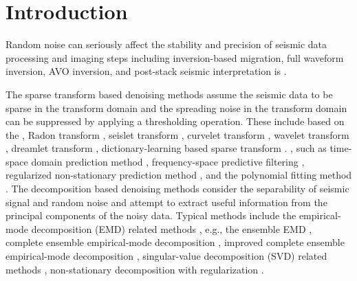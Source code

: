 \section{Introduction}
Random noise can seriously affect the stability and precision of seismic data processing and imaging steps including inversion-based migration, full waveform inversion, AVO inversion, and post-stack seismic interpretation  is  \cite[]{galbraith1991,block3d2017,zhaoqiang2018,shucai2020}. 

  The sparse transform based denoising methods assume the seismic data to be sparse in the transform domain and the spreading noise in the transform domain can be suppressed by applying a thresholding operation. These  include  based on the , Radon transform \cite[]{beylkin1987discrete}, seislet transform \cite[]{fomel2010seislet,yangkang2018eseis}, curvelet transform \cite[]{candes20061}, wavelet transform \cite[]{gilles2013,mostafa2016geo}, dreamlet transform \cite[]{huang2018damped}, dictionary-learning based sparse transform \cite[]{yanhui2016,amir2017sp,amir2017geo,shaohuan2019dl}. , such as time-space domain prediction method \cite[]{abma1995}, frequency-space predictive filtering \cite[]{canales1984}, regularized non-stationary prediction method \cite[]{guochang2012,guochang2013}, and the polynomial fitting method \cite[]{guochang20112}. The decomposition based denoising methods consider the separability of seismic signal and random noise and attempt to extract useful information from the principal components of the noisy data. Typical methods include the empirical-mode decomposition (EMD) related methods \cite[]{huangemd}, e.g., the ensemble EMD \cite[]{eemd}, complete ensemble empirical-mode decomposition \cite[]{epsceemd}, improved complete ensemble empirical-mode decomposition \cite[]{epsceemd},  singular-value decomposition (SVD) related methods \cite[]{bekara2007},  non-stationary decomposition with regularization \cite[]{li2018multidimensional}. 

